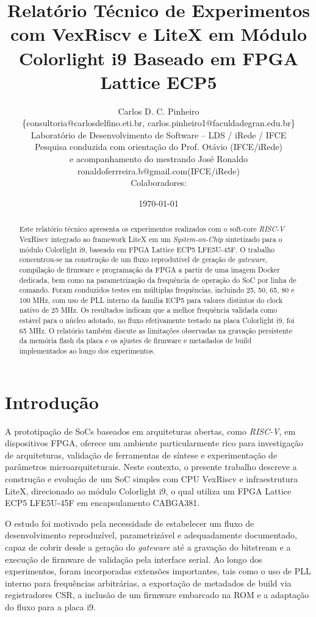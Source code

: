 \documentclass[10pt,twocolumn,a4paper]{article}
\title{Relat\'orio T\'ecnico de Experimentos com VexRiscv e LiteX em M\'odulo Colorlight i9 Baseado em FPGA Lattice ECP5}
\author{Carlos D. C. Pinheiro \\
\small \{consultoria@carlosdelfino.eti.br, carlos.pinheiro1@faculdadegran.edu.br\} \\
\small Laborat\'orio de Desenvolvimento de Software -- LDS / iRede / IFCE\\
\small Pesquisa conduzida com orienta\c{c}\~ao do Prof. Ot\'avio (IFCE/iRede)\\
\small e acompanhamento do mestrando Jos\'e Ronaldo {ronaldoferrreira.b@gmail.com}(IFCE/iRede)\\
\small Colaboradores: }
\date{\today}
\begin{document}
\maketitle

\begin{abstract}
Este relat\'orio t\'ecnico apresenta os experimentos realizados com o soft-core \textit{RISC-V} VexRiscv integrado ao framework LiteX em um \textit{System-on-Chip} sintetizado para o m\'odulo Colorlight i9, baseado em FPGA Lattice ECP5 LFE5U-45F. O trabalho concentrou-se na constru\c{c}\~ao de um fluxo reprodut\'ivel de gera\c{c}\~ao de \textit{gateware}, compila\c{c}\~ao de firmware e programa\c{c}\~ao da FPGA a partir de uma imagem Docker dedicada, bem como na parametriza\c{c}\~ao da frequ\^encia de opera\c{c}\~ao do SoC por linha de comando. Foram conduzidos testes em m\'ultiplas frequ\^encias, incluindo 25, 50, 65, 80 e 100 MHz, com uso de PLL interno da fam\'ilia ECP5 para valores distintos do clock nativo de 25 MHz. Os resultados indicam que a melhor frequ\^encia validada como est\'avel para o n\'ucleo adotado, no fluxo efetivamente testado na placa Colorlight i9, foi 65 MHz. O relat\'orio tamb\'em discute as limita\c{c}\~oes observadas na grava\c{c}\~ao persistente da mem\'oria flash da placa e os ajustes de firmware e metadados de build implementados ao longo dos experimentos.
\end{abstract}

\section{Introdu\c{c}\~ao}
A prototipa\c{c}\~ao de SoCs baseados em arquiteturas abertas, como \textit{RISC-V}, em dispositivos FPGA, oferece um ambiente particularmente rico para investiga\c{c}\~ao de arquiteturas, valida\c{c}\~ao de ferramentas de s\'intese e experimenta\c{c}\~ao de par\^ametros microarquiteturais. Neste contexto, o presente trabalho descreve a constru\c{c}\~ao e evolu\c{c}\~ao de um SoC simples com CPU VexRiscv e infraestrutura LiteX, direcionado ao m\'odulo Colorlight i9, o qual utiliza um FPGA Lattice ECP5 LFE5U-45F em encapsulamento CABGA381.

O estudo foi motivado pela necessidade de estabelecer um fluxo de desenvolvimento reproduz\'ivel, parametriz\'avel e adequadamente documentado, capaz de cobrir desde a gera\c{c}\~ao do \textit{gateware} at\'e a grava\c{c}\~ao do bitstream e a execu\c{c}\~ao de firmware de valida\c{c}\~ao pela interface serial. Ao longo dos experimentos, foram incorporadas extens\~oes importantes, tais como o uso de PLL interno para frequ\^encias arbitr\'arias, a exporta\c{c}\~ao de metadados de build via registradores CSR, a inclus\~ao de um firmware embarcado na ROM e a adapta\c{c}\~ao do fluxo para a placa i9.
\end{document}
